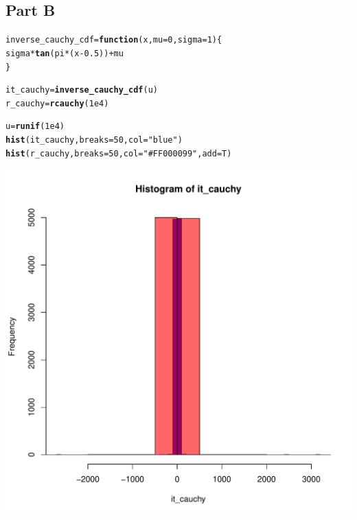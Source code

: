 \documentclass{article}\usepackage[]{graphicx}\usepackage[]{color}
\makeatletter
\newcommand{\hlnum}[1]{\textcolor[rgb]{0.686,0.059,0.569}{#1}}%
\newcommand{\hlstr}[1]{\textcolor[rgb]{0.192,0.494,0.8}{#1}}%
\newcommand{\hlopt}[1]{\textcolor[rgb]{0,0,0}{#1}}%
\newcommand{\hlstd}[1]{\textcolor[rgb]{0.345,0.345,0.345}{#1}}%
\newcommand{\hlkwa}[1]{\textcolor[rgb]{0.161,0.373,0.58}{\textbf{#1}}}%
\newcommand{\hlkwb}[1]{\textcolor[rgb]{0.69,0.353,0.396}{#1}}%
\newcommand{\hlkwc}[1]{\textcolor[rgb]{0.333,0.667,0.333}{#1}}%
\newcommand{\hlkwd}[1]{\textcolor[rgb]{0.737,0.353,0.396}{\textbf{#1}}}%
\newenvironment{kframe}{%
 \def\at@end@of@kframe{}%
 \ifinner\ifhmode%
  \def\at@end@of@kframe{\end{minipage}}%
  \begin{minipage}{\columnwidth}%
 \fi\fi%
 \def\FrameCommand##1{\hskip\@totalleftmargin \hskip-\fboxsep
 \colorbox{shadecolor}{##1}\hskip-\fboxsep
     \hskip-\linewidth \hskip-\@totalleftmargin \hskip\columnwidth}%
 \MakeFramed {\advance\hsize-\width
   \@totalleftmargin\z@ \linewidth\hsize
   \@setminipage}}%
 {\par\unskip\endMakeFramed%
 \at@end@of@kframe}
\newenvironment{knitrout}{}{} %
\makeatother
\begin{document}
\subsection*{Part B}
\begin{knitrout}
\color{fgcolor}\begin{kframe}
\begin{alltt}
\hlstd{inverse_cauchy_cdf} \hlkwb{=} \hlkwa{function}\hlstd{(}\hlkwc{x}\hlstd{,} \hlkwc{mu} \hlstd{=} \hlnum{0}\hlstd{,} \hlkwc{sigma} \hlstd{=} \hlnum{1}\hlstd{)\{}
  \hlstd{sigma}\hlopt{*}\hlkwd{tan}\hlstd{(pi}\hlopt{*}\hlstd{(x}\hlopt{-}\hlnum{0.5}\hlstd{))} \hlopt{+} \hlstd{mu}
\hlstd{\}}

\hlstd{it_cauchy} \hlkwb{=} \hlkwd{inverse_cauchy_cdf}\hlstd{(u)}
\hlstd{r_cauchy} \hlkwb{=} \hlkwd{rcauchy}\hlstd{(}\hlnum{1e4}\hlstd{)}

\hlstd{u} \hlkwb{=} \hlkwd{runif}\hlstd{(}\hlnum{1e4}\hlstd{)}
\hlkwd{hist}\hlstd{(it_cauchy,} \hlkwc{breaks} \hlstd{=} \hlnum{50}\hlstd{,} \hlkwc{col} \hlstd{=} \hlstr{"blue"}\hlstd{)}
\hlkwd{hist}\hlstd{(r_cauchy,} \hlkwc{breaks} \hlstd{=} \hlnum{50}\hlstd{,} \hlkwc{col} \hlstd{=} \hlstr{"#FF000099"}\hlstd{,} \hlkwc{add} \hlstd{= T)}
\end{alltt}
\end{kframe}
\includegraphics[width=0.50\linewidth]{figure/unnamed-chunk-3-1} 

\end{knitrout}
\end{document}
